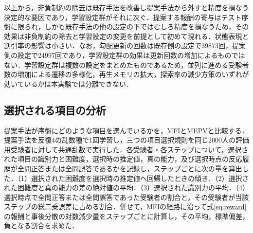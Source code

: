 \documentclass[paper]{ieicej}
\begin{document}
以上から，非負制約の除去は既存手法を改善し提案手法から外すと精度を損なう決定的な要因であり，学習設定群がそれに次ぐ．提案する報酬の寄与はテスト序盤に限られ，しかも既存手法の他の設定の下ではむしろ精度を損なうため，その効果は非負制約の除去と学習設定の変更を前提として初めて現れる．状態表現と割引率の影響は小さい．なお，勾配更新の回数は既存側の設定で39873回，提案側の設定で24997回であり，学習設定群の効果は更新回数の増加によるものではない．学習設定群は複数の設定をまとめたものであるため，並列に進める受験者数の増加による遷移の多様化，再生メモリの拡大，探索率の減少方策のいずれが効いているかは本実験では分離できない．

\subsection{選択される項目の分析}\label{sec:selection}

提案手法が序盤にどのような項目を選んでいるかを，MFIとMEPVと比較する．提案手法を反復4の乱数種で1回学習し，三つの項目選択規則を同じ2000人の評価用受験者に対して共通乱数で実行した．各受験者・各ステップについて，選択された項目の識別力と困難度，選択時の推定値，真の能力，及び選択時点の反応履歴が全問正答または全問誤答であるかを記録し，ステップごとに次の量を算出した．（1）選択された困難度を選択時の推定値へ回帰したときの傾き．（2）選択された困難度と真の能力の差の絶対値の平均．（3）選択された識別力の平均．（4）選択時点で全問正答または全問誤答であった受験者の割合と，その受験者が当該ステップの総二乗誤差に占める割合．併せて，MFIの経路に沿って式\eqref{eq:reward}の報酬と事後分散の対数減少量をステップごとに計算し，その平均，標準偏差，負となる割合を求めた．
\end{document}
